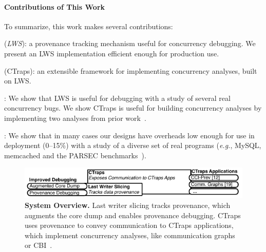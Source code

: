 \documentclass[10pt,nocopyrightspace]{sigplanconf}
\newcommand{\ctraps}{CTraps\xspace}
\newcommand{\lws}{LWS\xspace}
\newcommand{\Caption}[1]{\begin{minipage}{.95\columnwidth} \caption{#1} \end{minipage} \vspace{-1.2ex}}
\begin{document}
\paragraph{Contributions of This Work}
To summarize, this work makes several contributions:

 ({\em LWS}): a provenance tracking mechanism
useful for concurrency debugging.  We present an \lws implementation
efficient enough for production use.

\vspace{.5ex}
 (\ctraps): an extensible
framework for implementing concurrency analyses, built on \lws.  

\vspace{.5ex}
: We show that \lws is useful for debugging with
a study of several real concurrency bugs.  We show \ctraps is useful for
building concurrency analyses by implementing two analyses from prior
work~\cite{cci,defuse,recon}. 

\vspace{.5ex}
: We show that in many cases our designs have
overheads low enough for use in deployment (0--15\%) with a study of a diverse
set of real programs ({\em e.g.}, MySQL, memcached and the PARSEC
benchmarks~\cite{parsec}). 


\begin{figure}[t]
\centering
\includegraphics[width=\columnwidth]{figs/systemoverview.pdf}
\Caption{\label{fig:overview}{\bf System Overview.} Last writer slicing tracks provenance, which augments the core dump and enables provenance debugging.  CTraps uses provenance to convey communication to CTraps applications, which implement concurrency analyses, like communication graphs~\cite{recon} or CBI~\cite{cci}.}
\end{figure}
\end{document}
